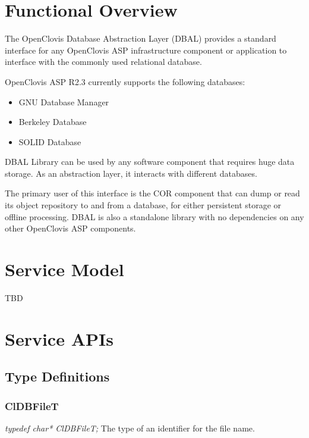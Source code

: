 \hypertarget{group__group15}{
\chapter{Functional Overview}
\label{group__group26}
}
\begin{flushleft}

The OpenClovis Database Abstraction Layer (DBAL) provides a standard interface for any Open\-Clovis ASP infrastructure component or application 
to interface with the commonly used relational database. \par
 \par
 Open\-Clovis ASP R2.3 currently supports the following databases: \par
 \par
 \begin{itemize}
\item GNU Database Manager \item Berkeley Database \item SOLID Database\end{itemize}

DBAL Library can be used by any software component that requires huge data storage. As an abstraction layer,
it interacts with different databases. 
 \par
 The primary user of this interface is the COR component that can dump or read its object repository to and from a database, for either persistent
 storage or offline processing. DBAL is also a standalone library with no dependencies on any other OpenClovis ASP components.
 
\chapter{Service Model}
	TBD

\chapter{Service APIs}



\section{Type Definitions}


\subsection{ClDBFileT}
\textit{typedef char*  ClDBFileT;}
\newline
\newline
The type of an identifier for the file name.



\end{flushleft}

